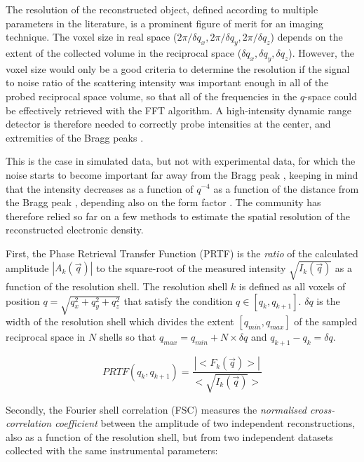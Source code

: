 The resolution of the reconstructed object, defined according to multiple parameters in the literature, is a prominent figure of merit for an imaging technique.
The voxel size in real space ($2\pi / \delta q_x, 2\pi / \delta q_y, 2\pi / \delta q_z$) depends on the extent of the collected volume in the reciprocal space ($\delta q_x, \delta q_y, \delta q_z$).
However, the voxel size would only be a good criteria to determine the resolution if the signal to noise ratio of the scattering intensity was important enough in all of the probed reciprocal space volume, so that all of the frequencies in the $q$-space could be effectively retrieved with the FFT algorithm.
A high-intensity dynamic range detector is therefore needed to correctly probe intensities at the center, and extremities of the Bragg peaks \parencite{Latychevskaia2018}.

This is the case in simulated data, but not with experimental data, for which the noise starts to become important far away from the Bragg peak \parencite{Bikondoa2021}, keeping in mind that the intensity decreases as a function of $q^{-4}$ as a function of the distance from the Bragg peak \parencite{Marchesini2003a}, depending also on the form factor \parencite{Croset2017}.
The community has therefore relied so far on a few methods to estimate the spatial resolution of the reconstructed electronic density.

First, the Phase Retrieval Transfer Function (PRTF) \parencite{Chapman2006} is the \textit{ratio} of the calculated amplitude $|A_k(\vec{q})|$ to the square-root of the measured intensity $\sqrt{I_k(\vec{q})}$ as a function of the resolution shell.
The resolution shell $k$ is defined as all voxels of position $q=\sqrt{q_x^2 + q_y^2 +q_z^2}$ that satisfy the condition $q \in [q_k, q_{k+1}]$.
$\delta q$ is the width of the resolution shell which divides the extent $[q_{min}, q_{max}]$ of the sampled reciprocal space in $N$ shells so that $q_{max} = q_{min} + N \times \delta q$ and $q_{k+1} - q_{k} = \delta q$.

\begin{equation}
    PRTF(q_k, q_{k+1}) = \frac{|<F_k(\vec{q})>|}{<\sqrt{I_k(\vec{q})}>}
\end{equation}

Secondly, the Fourier shell correlation (FSC) \parencite{VanHeel2005} measures the \textit{normalised cross-correlation coefficient} between the amplitude of two independent reconstructions, also as a function of the resolution shell, but from two independent datasets collected with the same instrumental parameters:

